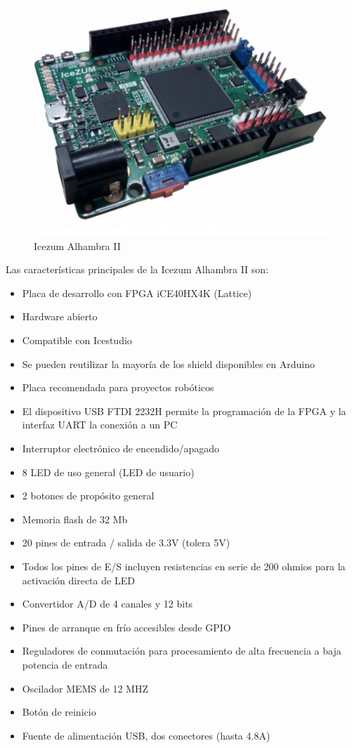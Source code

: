 \begin{figure}[H]
	\center
	\includegraphics[scale=0.6]{imagenes/Herramientas/Icezum.png}
	\caption{Icezum Alhambra II}
	\label{fig:Icezum Alhambra II}
\end{figure}

Las características principales de la Icezum Alhambra II son:

\begin{itemize}

	\item Placa de desarrollo con FPGA iCE40HX4K (Lattice) 
	\item Hardware abierto
	\item Compatible con Icestudio
	\item Se pueden reutilizar la mayoría de los shield disponibles en Arduino
	\item Placa recomendada para proyectos robóticos
	\item El dispositivo USB FTDI 2232H permite la programación de la FPGA y la interfaz UART la conexión a un PC
	\item Interruptor electrónico de encendido/apagado
	\item 8 LED de uso general (LED de usuario)
	\item 2 botones de propósito general
	\item Memoria flash de 32 Mb 
	\item 20 pines de entrada / salida de 3.3V (tolera 5V)
	\item Todos los pines de E/S incluyen resistencias en serie de 200 ohmios para la activación directa de LED
	\item Convertidor A/D de 4 canales y 12 bits
	\item Pines de arranque en frío accesibles desde GPIO
	\item Reguladores de conmutación para procesamiento de alta frecuencia a baja potencia de entrada
	\item Oscilador MEMS de 12 MHZ
	\item Botón de reinicio
	\item Fuente de alimentación USB, dos conectores (hasta 4.8A)
\end{itemize}


